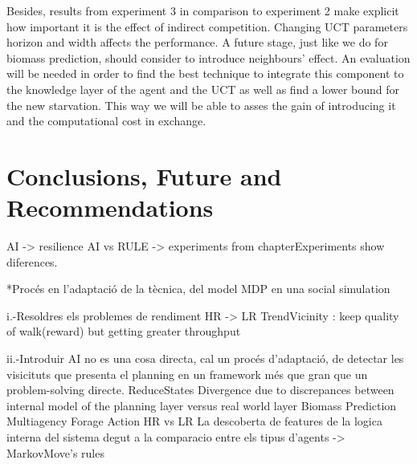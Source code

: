 \documentclass[11pt,oneside,a4paper,openright]{report}
\begin{document}
Besides, results from experiment 3 in comparison to experiment 2 make explicit how important it is the effect of indirect competition. Changing UCT parameters horizon and width affects the performance. A future stage, just like we do for biomass prediction, should consider to introduce
neighbours' effect. An evaluation will be needed in order to find the best technique to integrate this component to the knowledge layer of the agent and the UCT as well as find a lower bound for the new starvation. This way we will be able to asses the gain of introducing it and the computational cost in exchange.




\chapter{Conclusions, Future and Recommendations}

AI -> resilience
AI vs RULE -> experiments from chapter{Experiments} show diferences.

*Procés en l'adaptació de la tècnica, del model MDP en una social simulation

  i.-Resoldres els problemes de rendiment
      HR -> LR
      TrendVicinity : keep quality of walk(reward) but getting greater throughput
  
  ii.-Introduir AI no es una cosa directa, cal un procés d'adaptació, de detectar
les visicituts que presenta el planning en un framework més que gran que un
problem-solving directe.
    ReduceStates
    Divergence due to discrepances between internal model of the planning layer versus 
    real world layer
	Biomass Prediction
	Multiagency
	Forage Action HR vs LR
    La descoberta de features de la logica interna del sistema degut a la comparacio
    entre els tipus d'agents -> MarkovMove's rules



\end{document}
